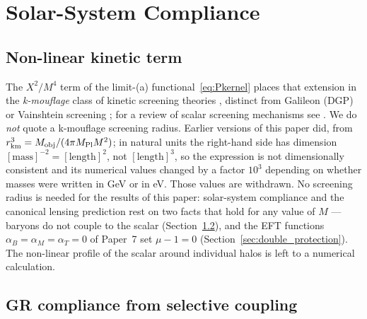 \documentclass[12pt,a4paper]{article}
\newcommand{\Mpl}{M_{\mathrm{Pl}}}
\begin{document}
\section{Solar-System Compliance}
\label{sec:vainshtein}

\subsection{Non-linear kinetic term}

The $X^2/M^4$ term of the limit-(a) functional~\eqref{eq:Pkernel} places that extension in the
\emph{k-mouflage} class of kinetic screening theories \citep{brax2014},
distinct from Galileon (DGP) \citep{deffayet2001} or Vainshtein
screening \citep{vainshtein1972,babichev2013}; for a review of
scalar screening mechanisms see \citet{Koyama2018}.
We do \emph{not} quote a k-mouflage screening radius.
Earlier versions of this paper did, from
$r_{\rm km}^3 = M_{\rm obj}/(4\pi\Mpl M^2)$; in natural units the
right-hand side has dimension $[\mathrm{mass}]^{-2} = [\mathrm{length}]^2$,
not $[\mathrm{length}]^3$, so the expression is not dimensionally consistent
and its numerical values changed by a factor $10^3$ depending on whether
masses were written in GeV or in eV.  Those values are withdrawn.
No screening radius is needed for the results of this paper: solar-system
compliance and the canonical lensing prediction rest on two facts that hold
for any value of $M$ --- baryons do not couple to the scalar
(Section~\ref{sec:gr_compliance}), and the EFT functions
$\alpha_B=\alpha_M=\alpha_T=0$ of Paper~7 set $\mu-1=0$
(Section~\ref{sec:double_protection}).
The non-linear profile of the scalar around individual halos is left to a
numerical calculation.

\subsection{GR compliance from selective coupling}
\label{sec:gr_compliance}
\end{document}
